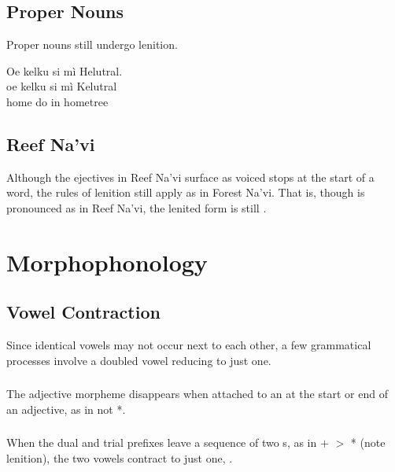 \subsection{Proper Nouns} Proper nouns still undergo lenition.

\begin{interlin} \label{lenition:ex01}
\glll Oe kelku si mì Helutral. \\
      oe kelku si mì Kelutral \\
      home do in hometree \\
\end{interlin}


\subsection{Reef Na'vi} 
Although the ejectives in Reef Na'vi surface as voiced stops at the
start of a word, the rules of lenition still apply as in Forest Na'vi.
That is, though   is pronounced as  in Reef
Na'vi, the lenited form is still .

\section{Morphophonology}

\subsection{Vowel Contraction} Since identical vowels may not occur
next to each other, a few grammatical processes involve a doubled
vowel reducing to just one.\label{l-and-s:contract}

\subsubsection{} The adjective morpheme  disappears when
attached to an  at the start or end of an adjective, as in
 not *.

\subsubsection{} When the dual and trial prefixes leave a sequence of
two s, as in  $+$  $>$ * (note
lenition), the two vowels contract to just one, .
\label{l-and-s:phonotactics:nsc} 

